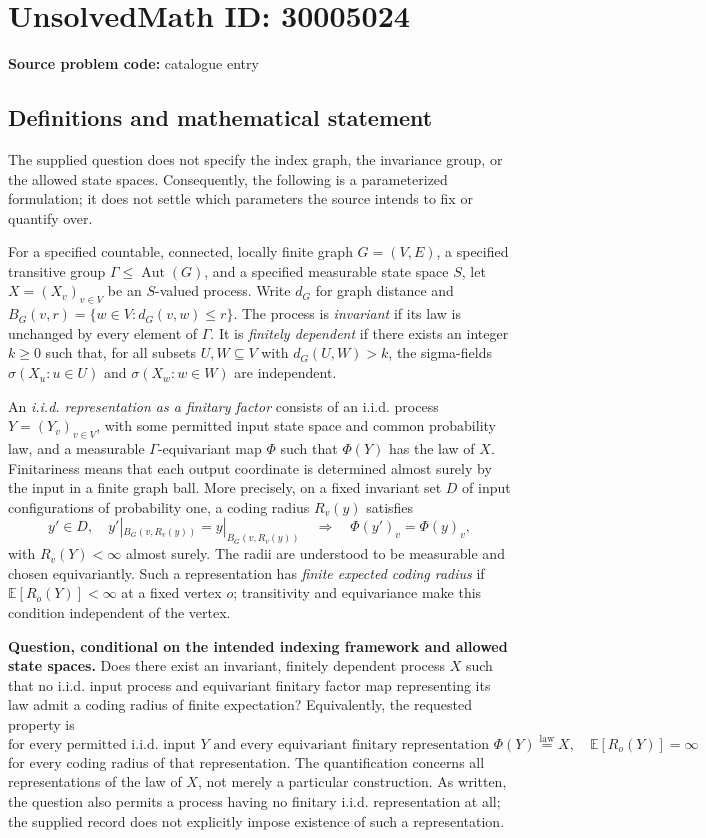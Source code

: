 \documentclass[11pt]{article}
\begin{document}
\section*{UnsolvedMath ID: 30005024}
\textbf{Source problem code:} catalogue entry
\subsection{Definitions and mathematical statement}
The supplied question does not specify the index graph, the invariance group, or the allowed state spaces. Consequently, the following is a parameterized formulation; it does not settle which parameters the source intends to fix or quantify over.

For a specified countable, connected, locally finite graph \(G=(V,E)\), a specified transitive group \(\Gamma\leq\operatorname{Aut}(G)\), and a specified measurable state space \(S\), let \(X=(X_v)_{v\in V}\) be an \(S\)-valued process. Write \(d_G\) for graph distance and \(B_G(v,r)=\{w\in V:d_G(v,w)\leq r\}\). The process is \emph{invariant} if its law is unchanged by every element of \(\Gamma\). It is \emph{finitely dependent} if there exists an integer \(k\geq0\) such that, for all subsets \(U,W\subseteq V\) with \(d_G(U,W)>k\), the sigma-fields \(\sigma(X_u:u\in U)\) and \(\sigma(X_w:w\in W)\) are independent.

An \emph{i.i.d. representation as a finitary factor} consists of an i.i.d. process \(Y=(Y_v)_{v\in V}\), with some permitted input state space and common probability law, and a measurable \(\Gamma\)-equivariant map \(\Phi\) such that \(\Phi(Y)\) has the law of \(X\). Finitariness means that each output coordinate is determined almost surely by the input in a finite graph ball. More precisely, on a fixed invariant set \(D\) of input configurations of probability one, a coding radius \(R_v(y)\) satisfies
\[
 y'\in D,\quad y'|_{B_G(v,R_v(y))}=y|_{B_G(v,R_v(y))}
 \quad\Longrightarrow\quad
 \Phi(y')_v=\Phi(y)_v,
\]
with \(R_v(Y)<\infty\) almost surely. The radii are understood to be measurable and chosen equivariantly. Such a representation has \emph{finite expected coding radius} if \(\mathbb E[R_o(Y)]<\infty\) at a fixed vertex \(o\); transitivity and equivariance make this condition independent of the vertex.

\textbf{Question, conditional on the intended indexing framework and allowed state spaces.} Does there exist an invariant, finitely dependent process \(X\) such that no i.i.d. input process and equivariant finitary factor map representing its law admit a coding radius of finite expectation? Equivalently, the requested property is
\[
 \text{for every permitted i.i.d. input }Y\text{ and every equivariant finitary representation }\Phi(Y)\overset{\mathrm{law}}=X,
 \quad \mathbb E[R_o(Y)]=\infty
\]
for every coding radius of that representation. The quantification concerns all representations of the law of \(X\), not merely a particular construction. As written, the question also permits a process having no finitary i.i.d. representation at all; the supplied record does not explicitly impose existence of such a representation.
\end{document}
